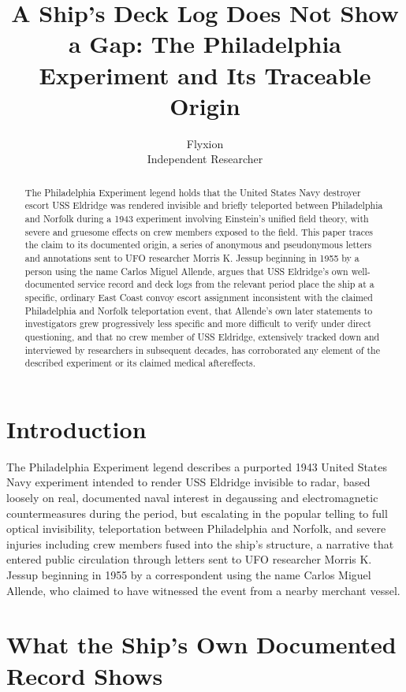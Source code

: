 \documentclass[11pt]{article}
\title{A Ship's Deck Log Does Not Show a Gap: The Philadelphia Experiment and Its Traceable Origin}
\author{Flyxion \\ \small Independent Researcher}
\date{}
\begin{document}
\maketitle

\begin{abstract}
The Philadelphia Experiment legend holds that the United States Navy destroyer escort USS Eldridge was rendered invisible and briefly teleported between Philadelphia and Norfolk during a 1943 experiment involving Einstein's unified field theory, with severe and gruesome effects on crew members exposed to the field. This paper traces the claim to its documented origin, a series of anonymous and pseudonymous letters and annotations sent to UFO researcher Morris K. Jessup beginning in 1955 by a person using the name Carlos Miguel Allende, argues that USS Eldridge's own well-documented service record and deck logs from the relevant period place the ship at a specific, ordinary East Coast convoy escort assignment inconsistent with the claimed Philadelphia and Norfolk teleportation event, that Allende's own later statements to investigators grew progressively less specific and more difficult to verify under direct questioning, and that no crew member of USS Eldridge, extensively tracked down and interviewed by researchers in subsequent decades, has corroborated any element of the described experiment or its claimed medical aftereffects.
\end{abstract}

\section{Introduction}

The Philadelphia Experiment legend describes a purported 1943 United States Navy experiment intended to render USS Eldridge invisible to radar, based loosely on real, documented naval interest in degaussing and electromagnetic countermeasures during the period, but escalating in the popular telling to full optical invisibility, teleportation between Philadelphia and Norfolk, and severe injuries including crew members fused into the ship's structure, a narrative that entered public circulation through letters sent to UFO researcher Morris K. Jessup beginning in 1955 by a correspondent using the name Carlos Miguel Allende, who claimed to have witnessed the event from a nearby merchant vessel.

\section{What the Ship's Own Documented Record Shows}
\end{document}
